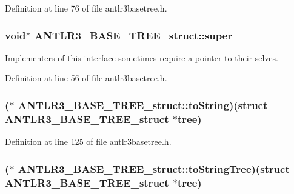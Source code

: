 Definition at line 76 of file antlr3basetree.\-h.

\hypertarget{struct_a_n_t_l_r3___b_a_s_e___t_r_e_e__struct_abd20044da7f517e47aaa0b65d28d9b64}{
\subsubsection[{super}]{\setlength{\rightskip}{0pt plus 5cm}void$\ast$ A\-N\-T\-L\-R3\-\_\-\-B\-A\-S\-E\-\_\-\-T\-R\-E\-E\-\_\-struct\-::super}}\label{struct_a_n_t_l_r3___b_a_s_e___t_r_e_e__struct_abd20044da7f517e47aaa0b65d28d9b64}
Implementers of this interface sometimes require a pointer to their selves. 

Definition at line 56 of file antlr3basetree.\-h.

\hypertarget{struct_a_n_t_l_r3___b_a_s_e___t_r_e_e__struct_ad04c2b4b0cfa51ba4ca6513792546c30}{
\subsubsection[{to\-String}]{($\ast$ A\-N\-T\-L\-R3\-\_\-\-B\-A\-S\-E\-\_\-\-T\-R\-E\-E\-\_\-struct\-::to\-String)(struct {\bf A\-N\-T\-L\-R3\-\_\-\-B\-A\-S\-E\-\_\-\-T\-R\-E\-E\-\_\-struct} $\ast$tree)}}\label{struct_a_n_t_l_r3___b_a_s_e___t_r_e_e__struct_ad04c2b4b0cfa51ba4ca6513792546c30}


Definition at line 125 of file antlr3basetree.\-h.

\hypertarget{struct_a_n_t_l_r3___b_a_s_e___t_r_e_e__struct_a1c6034a6ae25cdec75988924b56608ac}{
\subsubsection[{to\-String\-Tree}]{($\ast$ A\-N\-T\-L\-R3\-\_\-\-B\-A\-S\-E\-\_\-\-T\-R\-E\-E\-\_\-struct\-::to\-String\-Tree)(struct {\bf A\-N\-T\-L\-R3\-\_\-\-B\-A\-S\-E\-\_\-\-T\-R\-E\-E\-\_\-struct} $\ast$tree)}}\label{struct_a_n_t_l_r3___b_a_s_e___t_r_e_e__struct_a1c6034a6ae25cdec75988924b56608ac}


